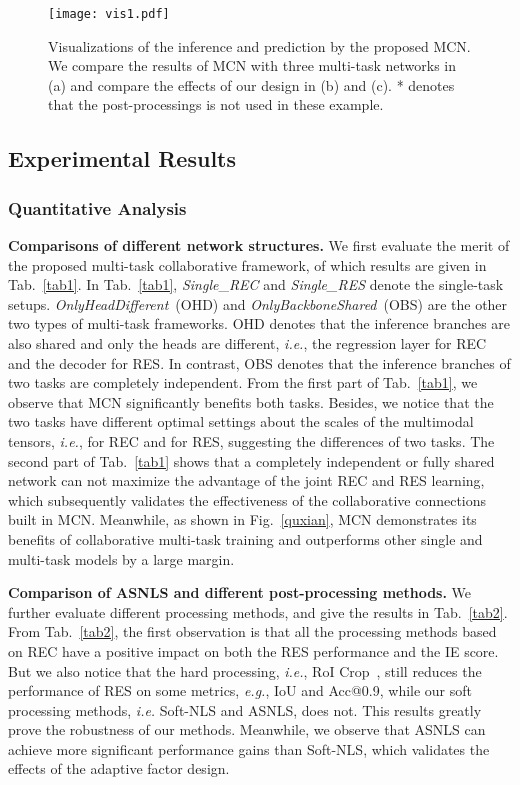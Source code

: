 \documentclass[10pt,twocolumn,letterpaper]{article}
\begin{document}
\begin{figure*}[t]
	\centering
	\texttt{[image: vis1.pdf]} \caption{Visualizations of the inference and prediction by the proposed MCN.  We compare the results of MCN with  three  multi-task networks in (a) and   compare the effects of our design in (b) and (c). * denotes that the post-processings is not used in these example.}
	\label{vis1}
\end{figure*}


\subsection{Experimental Results}
\subsubsection{Quantitative Analysis}
\textbf{Comparisons of different  network structures.
} 
We first evaluate the merit of the proposed multi-task collaborative framework, of which results are given in Tab.~\ref{tab1}.
In Tab.~\ref{tab1}, \emph{Single}\_\emph{REC} and \emph{Single\_RES} denote the single-task  setups.
\emph{OnlyHeadDifferent}~(OHD) and \emph{OnlyBackboneShared}~(OBS) are the other two types of multi-task frameworks. OHD denotes that the inference branches are also shared and only the heads are different, \emph{i.e.}, the regression layer for REC and the decoder for RES. 
In contrast, OBS denotes that the inference branches of two tasks are completely independent. 
From the first part of Tab.~\ref{tab1}, we observe that MCN  significantly benefits both  tasks.
Besides, we notice that the two tasks have different optimal settings about the scales of the multimodal tensors, \emph{i.e.},  for REC and  for RES, suggesting the differences of two tasks. 
The second part of Tab.~\ref{tab1} shows that a completely independent or fully shared network can not maximize the advantage of the joint REC and RES learning, which subsequently validates the effectiveness of the collaborative connections built in MCN. Meanwhile,  as shown  in Fig.~\ref{quxian},  MCN demonstrates its benefits of collaborative multi-task training and  outperforms other single and multi-task models  by a large margin.  




\textbf{Comparison of ASNLS and different post-processing methods.} 
We further evaluate  different processing methods,  and give the results in Tab.~\ref{tab2}.
From Tab.~\ref{tab2}, the first observation is that all the processing methods based on REC have a positive impact on both the RES performance and the IE score.  
But we also notice that the hard processing, \emph{i.e.}, RoI Crop~\cite{he2017mask,ren2017faster},  still reduces the performance of RES on some metrics, \emph{e.g.}, IoU and Acc@0.9, while our soft processing methods, \emph{i.e.} Soft-NLS and ASNLS, does not. 
This results greatly prove the robustness of our methods.
Meanwhile, we  observe that ASNLS can achieve more significant performance gains than Soft-NLS, which validates the effects of the adaptive factor design. 
\end{document}
